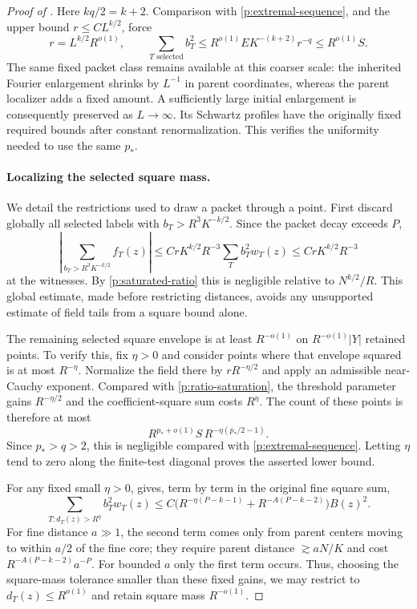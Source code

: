 \begin{proof}[Proof of ]
Here $kq/2=k+2$.  Comparison with \eqref{p:extremal-sequence}, and the
upper bound $r\leq CL^{k/2}$, force
\begin{equation}\label{p:saturated-ratio}
 r=L^{k/2}R^{o(1)},\qquad
 \sum_{T\text{ selected}}b_T^2
 \leq R^{o(1)}E K^{-(k+2)}r^{-q}
 \leq R^{o(1)}S.
\end{equation}
The same fixed packet class remains available at this coarser scale: the
inherited Fourier enlargement shrinks by $L^{-1}$ in parent coordinates,
whereas the parent localizer adds a fixed amount.  A sufficiently large
initial enlargement is consequently preserved as $L\to\infty$.  Its
Schwartz profiles have the originally fixed required bounds after constant
renormalization.  This verifies the uniformity needed to use the same $p_*$.

\paragraph{Localizing the selected square mass.}
We detail the restrictions used to draw a packet through a point.  First
discard globally all selected labels with
$b_T>R^3K^{-k/2}$.  Since the packet decay exceeds $P$,
\[
 \left|\sum_{b_T>R^3K^{-k/2}}f_T(z)\right|
 \leq C r K^{k/2}R^{-3}\sum_Tb_T^2w_T(z)
 \leq C r K^{k/2}R^{-3}
\]
at the witnesses.  By \eqref{p:saturated-ratio} this is negligible relative
to $N^{k/2}/R$.  This global estimate, made before restricting distances,
avoids any unsupported estimate of field tails from a square bound alone.

The remaining selected square envelope is at least $R^{-o(1)}$ on
$R^{-o(1)}|Y|$ retained points.  To verify this, fix $\eta>0$ and consider
points where that envelope squared is at most $R^{-\eta}$.  Normalize the
field there by $rR^{-\eta/2}$ and apply an admissible near-Cauchy exponent.
Compared with \eqref{p:ratio-saturation}, the threshold parameter gains
$R^{-\eta/2}$ and the coefficient-square sum costs $R^\eta$.
The count of these points is therefore at most
\[
 R^{p_*+o(1)}S\,R^{-\eta(p_*/2-1)}.
\]
Since $p_*>q>2$, this is negligible compared with
\eqref{p:extremal-sequence}.  Letting $\eta$ tend to zero along the finite-test
diagonal proves the asserted lower bound.

For any fixed small $\eta>0$,  gives, term by term in
the original fine square sum,
\[
 \sum_{T:d_T(z)>R^\eta}b_T^2w_T(z)
 \leq C\big(R^{-\eta(P-k-1)}+R^{-A(P-k-2)}\big)B(z)^2.
\]
For fine distance $a\gg1$, the second term comes only from parent centers
moving to within $a/2$ of the fine core; they require parent distance
$\gtrsim aN/K$ and cost $R^{-A(P-k-2)}a^{-P}$.
For bounded $a$ only the first term occurs.  Thus, choosing the square-mass
tolerance smaller than these fixed gains, we may restrict to
$d_T(z)\leq R^{o(1)}$ and retain square mass $R^{-o(1)}$.


\end{proof}
